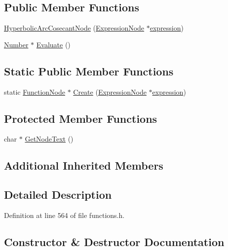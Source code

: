 \subsection*{Public Member Functions}
\begin{DoxyCompactItemize}
\item 
\hyperlink{classHyperbolicArcCosecantNode_afb3223e893556ffadca8796cec9062f5}{Hyperbolic\+Arc\+Cosecant\+Node} (\hyperlink{classExpressionNode}{Expression\+Node} $\ast$\hyperlink{classFunctionNode_ad7577b179a1937aaf8a0058bb5b546dc}{expression})
\item 
\hyperlink{structNumber}{Number} $\ast$ \hyperlink{classHyperbolicArcCosecantNode_acefcd296ae5574bc5f57b3b234f23dba}{Evaluate} ()
\end{DoxyCompactItemize}
\subsection*{Static Public Member Functions}
\begin{DoxyCompactItemize}
\item 
static \hyperlink{classFunctionNode}{Function\+Node} $\ast$ \hyperlink{classHyperbolicArcCosecantNode_ad40421e2519b6a034f02e5411dbcc58e}{Create} (\hyperlink{classExpressionNode}{Expression\+Node} $\ast$\hyperlink{classFunctionNode_ad7577b179a1937aaf8a0058bb5b546dc}{expression})
\end{DoxyCompactItemize}
\subsection*{Protected Member Functions}
\begin{DoxyCompactItemize}
\item 
char $\ast$ \hyperlink{classHyperbolicArcCosecantNode_adfeb956f89ecdab30e57a4e80b2ca5aa}{Get\+Node\+Text} ()
\end{DoxyCompactItemize}
\subsection*{Additional Inherited Members}


\subsection{Detailed Description}


Definition at line 564 of file functions.\+h.



\subsection{Constructor \& Destructor Documentation}
